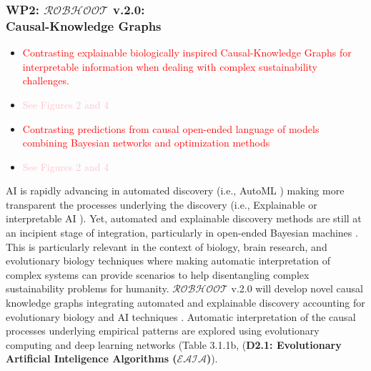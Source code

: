 \documentclass[11pt, a4paper]{article} %
\begin{document}
\subsubsection{{\bf WP2: $\mathcal{ROBHOOT}$ v.2.0}: \\ Causal-Knowledge Graphs}

  \begin{itemize}
  \item \textcolor{red}{Contrasting explainable biologically inspired
      Causal-Knowledge Graphs for interpretable information when
      dealing with complex sustainability challenges.}
   \item \textcolor{pink}{See Figures 2 and 4}
   \item \textcolor{red}{Contrasting predictions from causal
       open-ended language of models combining Bayesian networks and
       optimization methods}
   \item \textcolor{pink}{See Figures 2 and 4}
   \end{itemize}

   AI is rapidly advancing in automated discovery (i.e., AutoML
   \citep{Real2020}) making more transparent the processes underlying
   the discovery (i.e., Explainable or interpretable AI
   \citep{Gil2019,Futia2020}). Yet, automated and explainable
   discovery methods are still at an incipient stage of integration,
   particularly in open-ended Bayesian machines
   \citep{Guimera2020}. This is particularly relevant in the context
   of biology, brain research, and evolutionary biology techniques
   where making automatic interpretation of complex systems can
   provide scenarios to help disentangling complex sustainability
   problems for humanity. $\mathcal{ROBHOOT}$ v.2.0 will develop novel
   causal knowledge graphs integrating automated and explainable
   discovery accounting for evolutionary biology and AI techniques
   \citep{Maass2014,Maass2015}. Automatic interpretation of the causal
   processes underlying empirical patterns are explored using
   evolutionary computing and deep learning networks (Table 3.1.1b,
   ({\bf D2.1: Evolutionary Artificial Inteligence Algorithms
     ($\mathcal{EAIA}$)}).
\end{document}
